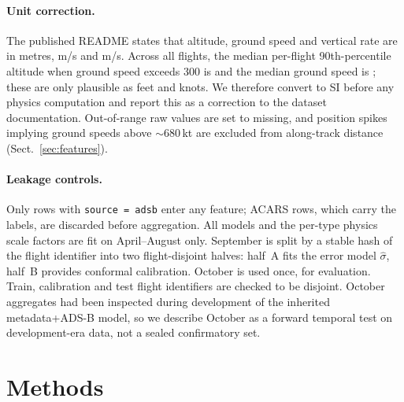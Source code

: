 \documentclass[runningheads]{llncs}
\begin{document}
\paragraph{Unit correction.}
The published README states that altitude, ground speed and vertical rate are in metres, m/s and m/s. Across all flights, the median per-flight 90th-percentile altitude when ground speed exceeds 300 is \unitAlt{} and the median ground speed is \unitGs{}; these are only plausible as feet and knots. We therefore convert to SI before any physics computation and report this as a correction to the dataset documentation. Out-of-range raw values are set to missing, and position spikes implying ground speeds above $\sim$680\,kt are excluded from along-track distance (Sect.~\ref{sec:features}).

\paragraph{Leakage controls.}
Only rows with \texttt{source = adsb} enter any feature; ACARS rows, which carry the labels, are discarded before aggregation. All models and the per-type physics scale factors are fit on April--August only. September is split by a stable hash of the flight identifier into two flight-disjoint halves: half~A fits the error model $\hat\sigma$, half~B provides conformal calibration. October is used once, for evaluation. Train, calibration and test flight identifiers are checked to be disjoint. October aggregates had been inspected during development of the inherited metadata+ADS-B model, so we describe October as a forward temporal test on development-era data, not a sealed confirmatory set.

\section{Methods}\label{sec:methods}
\end{document}

